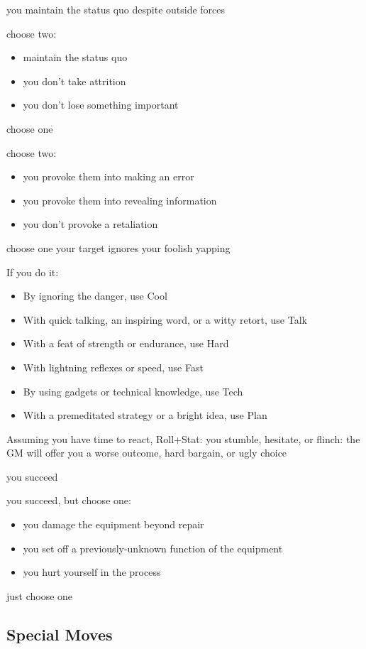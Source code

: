{you maintain the status quo despite outside forces}
{choose two:
\begin{itemize}
\item maintain the status quo
\item you don't take attrition
\item you don't lose something important
\end{itemize}}
{choose one}

{choose two:
\begin{itemize}
\item you provoke them into making an error
\item you provoke them into revealing information
\item you don't provoke a retaliation
\end{itemize}}
{choose one}
{your target ignores your foolish yapping}

If you do it:
\begin{itemize}
\item By ignoring the danger, use Cool
\item With quick talking, an inspiring word, or a witty retort, use Talk
\item With a feat of strength or endurance, use Hard
\item With lightning reflexes or speed, use Fast
\item By using gadgets or technical knowledge, use Tech
\item With a premeditated strategy or a bright idea, use Plan
\end{itemize}
Assuming you have time to react, Roll+Stat:
{you stumble, hesitate, or flinch: the GM will offer you a worse outcome, hard bargain, or ugly choice}

{you succeed}
{you succeed, but choose one:
\begin{itemize}
\item you damage the equipment beyond repair
\item you set off a previously-unknown function of the equipment
\item you hurt yourself in the process
\end{itemize}}
{just choose one}

\subsection{Special Moves}